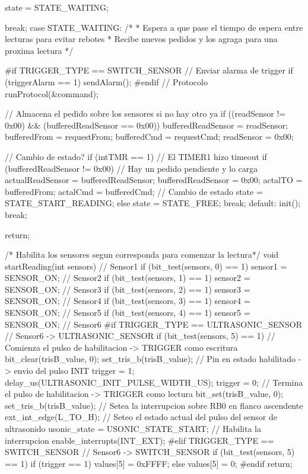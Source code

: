 {\begin{verbatimtab}
{{{				state = STATE_WAITING;
				
				break;
			case STATE_WAITING:
				/*
				* Espera a que pase el tiempo de espera entre lecturas para evitar rebotes
				* Recibe nuevos pedidos y los agraga para una proxima lectura
				*/
				
#if TRIGGER_TYPE == SWITCH_SENSOR
				// Enviar alarma de trigger
				if (triggerAlarm == 1)
					sendAlarm();
#endif
				// Protocolo
				runProtocol(&command);
				
				// Almacena el pedido sobre los sensores si no hay otro ya
				if ((readSensor != 0x00) && (bufferedReadSensor == 0x00))
				{
					bufferedReadSensor = readSensor;
					bufferedFrom = requestFrom;
					bufferedCmd = requestCmd;
					readSensor = 0x00;
				}
				
				// Cambio de estado?
				if (intTMR == 1)
				{
					// El TIMER1 hizo timeout
					if (bufferedReadSensor != 0x00)
					{
						// Hay un pedido pendiente y lo carga
						actualReadSensor = bufferedReadSensor;
						bufferedReadSensor = 0x00;
						actalTO = bufferedFrom;
						actalCmd = bufferedCmd;
						// Cambio de estado 
						state = STATE_START_READING;
					} else {
						state = STATE_FREE;
					}	
				}
				break;
			default:
				init();
				break;
		}
	}
	return;
}

/* Habilita los sensores segun corresponda para comenzar la lectura*/
void startReading(int sensors)
{
	// Sensor1
	if (bit_test(sensors, 0) == 1)
		sensor1 = SENSOR_ON;
	// Sensor2
	if (bit_test(sensors, 1) == 1)
		sensor2 = SENSOR_ON;
	// Sensor3
	if (bit_test(sensors, 2) == 1)
		sensor3 = SENSOR_ON;
	// Sensor4
	if (bit_test(sensors, 3) == 1)
		sensor4 = SENSOR_ON;
	// Sensor5
	if (bit_test(sensors, 4) == 1)
		sensor5 = SENSOR_ON;
	// Sensor6
#if TRIGGER_TYPE == ULTRASONIC_SENSOR
	// Sensor6 -> ULTRASONIC_SENSOR
	if (bit_test(sensors, 5) == 1)
	{
		// Comienza el pulso de habilitacion -> TRIGGER como escritura
		bit_clear(trisB_value, 0);
		set_tris_b(trisB_value);
		// Pin en estado habilitado -> envio del pulso INIT
		trigger = 1;
		delay_us(ULTRASONIC_INIT_PULSE_WIDTH_US);
		trigger = 0;
		// Termina el pulso de habilitacion -> TRIGGER como lectura
		bit_set(trisB_value, 0);
		set_tris_b(trisB_value);
		// Setea la interrupcion sobre RB0 en flanco ascendente
		ext_int_edge(L_TO_H);
		// Seteo el estado actual del pulso del sensor de ultrasonido
		usonic_state = USONIC_STATE_START;
		// Habilita la interrupcion
		enable_interrupts(INT_EXT);
	}
#elif TRIGGER_TYPE == SWITCH_SENSOR
	// Sensor6 -> SWITCH_SENSOR
	if (bit_test(sensors, 5) == 1)
	{
		if (trigger == 1)
			values[5] = 0xFFFF;
		else
			values[5] = 0;		
	} 
#endif
	return;
}	


\end{verbatimtab}}
